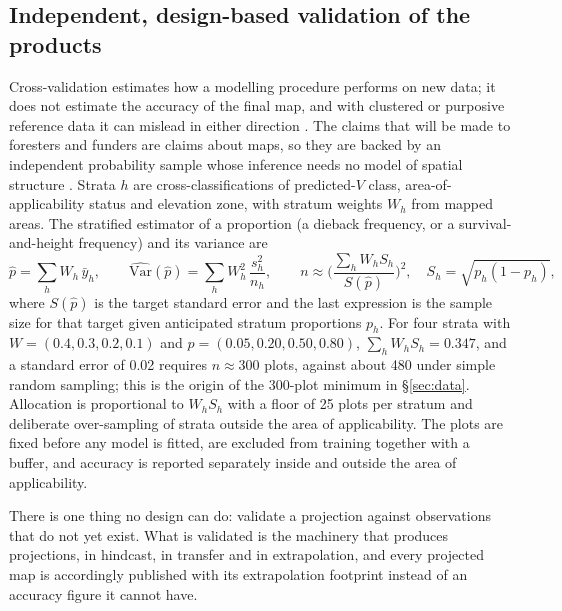 \subsection{Independent, design-based validation of the products}\label{sec:design-based}
Cross-validation estimates how a modelling procedure performs on new data; it does not estimate the accuracy of the final map, and with clustered or purposive reference data it can mislead in either direction \citep{Wadoux2021}. The claims that will be made to foresters and funders are claims about maps, so they are backed by an independent probability sample whose inference needs no model of spatial structure \citep{Olofsson2014,Stehman2019}. Strata $h$ are cross-classifications of predicted-$V$ class, area-of-applicability status and elevation zone, with stratum weights $W_h$ from mapped areas. The stratified estimator of a proportion (a dieback frequency, or a survival-and-height frequency) and its variance are
\begin{equation}\label{eq:strat}
\hat p=\sum_h W_h\,\bar y_h,\qquad \widehat{\mathrm{Var}}(\hat p)=\sum_h W_h^2\,\frac{s_h^2}{n_h},\qquad n\approx\Big(\frac{\sum_h W_h S_h}{S(\hat p)}\Big)^{2},\quad S_h=\sqrt{p_h(1-p_h)},
\end{equation}
where $S(\hat p)$ is the target standard error and the last expression is the sample size for that target given anticipated stratum proportions $p_h$. For four strata with $W=(0.4,0.3,0.2,0.1)$ and $p=(0.05,0.20,0.50,0.80)$, $\sum_hW_hS_h=0.347$, and a standard error of 0.02 requires $n\approx300$ plots, against about 480 under simple random sampling; this is the origin of the 300-plot minimum in \S\ref{sec:data}. Allocation is proportional to $W_hS_h$ with a floor of 25 plots per stratum and deliberate over-sampling of strata outside the area of applicability. The plots are fixed before any model is fitted, are excluded from training together with a buffer, and accuracy is reported separately inside and outside the area of applicability.

There is one thing no design can do: validate a projection against observations that do not yet exist. What is validated is the machinery that produces projections, in hindcast, in transfer and in extrapolation, and every projected map is accordingly published with its extrapolation footprint instead of an accuracy figure it cannot have.
